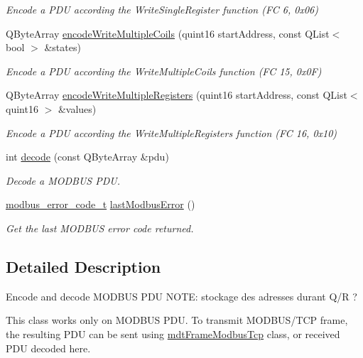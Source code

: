 \begin{DoxyCompactItemize}
\begin{DoxyCompactList}\small\item\em Encode a PDU according the WriteSingleRegister function (FC 6, 0x06) \end{DoxyCompactList}\item 
QByteArray \hyperlink{classmdt_frame_codec_modbus_a12013e4433f96b2658b464698135e9fa}{encodeWriteMultipleCoils} (quint16 startAddress, const QList$<$ bool $>$ \&states)
\begin{DoxyCompactList}\small\item\em Encode a PDU according the WriteMultipleCoils function (FC 15, 0x0F) \end{DoxyCompactList}\item 
QByteArray \hyperlink{classmdt_frame_codec_modbus_abede9423d90c3dac725bbd50f9efd741}{encodeWriteMultipleRegisters} (quint16 startAddress, const QList$<$ quint16 $>$ \&values)
\begin{DoxyCompactList}\small\item\em Encode a PDU according the WriteMultipleRegisters function (FC 16, 0x10) \end{DoxyCompactList}\item 
int \hyperlink{classmdt_frame_codec_modbus_a426f465363a49d70890a462b40677787}{decode} (const QByteArray \&pdu)
\begin{DoxyCompactList}\small\item\em Decode a MODBUS PDU. \end{DoxyCompactList}\item 
\hyperlink{classmdt_frame_codec_modbus_a31d8291be7f8636d5d295ce3066d7ac7}{modbus\_\-error\_\-code\_\-t} \hyperlink{classmdt_frame_codec_modbus_a21f3102e12f1a1d9c4145c1ce1f8e6b6}{lastModbusError} ()
\begin{DoxyCompactList}\small\item\em Get the last MODBUS error code returned. \end{DoxyCompactList}\end{DoxyCompactItemize}


\subsection{Detailed Description}
Encode and decode MODBUS PDU NOTE: stockage des adresses durant Q/R ? 

This class works only on MODBUS PDU. To transmit MODBUS/TCP frame, the resulting PDU can be sent using \hyperlink{classmdt_frame_modbus_tcp}{mdtFrameModbusTcp} class, or received PDU decoded here.

